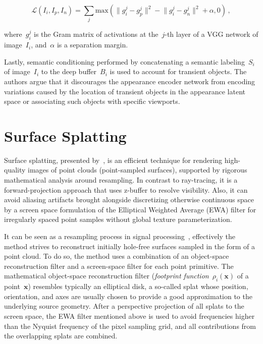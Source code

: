 $$\mathcal{L}(I_i, I_p, I_n) = \sum_j \mathrm{max}\left(\lVert g_i^j-g_p^j\rVert^2 - \lVert g_i^j-g_n^j\rVert^2 + \alpha, 0\right)\,,$$

where~$g_i^j$ is the Gram matrix of activations at the~$j$-th layer of a VGG network of image~$I_i$,
and~$\alpha$ is a separation margin.

Lastly, semantic conditioning performed by concatenating a semantic labeling~$S_i$ of
image~$I_i$ to the deep buffer~$B_i$ is used to account for transient objects. The authors argue that
it discourages the appearance encoder network from encoding variations caused by the location of
transient objects in the appearance latent space or associating such objects with specific viewports.

\section{Surface Splatting}

Surface splatting, presented by~\citet{SurfaceSplatting}, is an efficient technique for rendering high-quality
images of point clouds (point-sampled surfaces), supported by rigorous mathematical analysis around
resampling. In contrast to ray-tracing, it is a forward-projection approach that uses z-buffer to
resolve visibility. Also, it can avoid aliasing artifacts brought alongside discretizing otherwise
continuous space by a screen space formulation of the Elliptical Weighted Average (EWA) filter for
irregularly spaced point samples without global texture parameterization.

It can be seen as a resampling process in signal processing~\citep{PointRendering}, effectively the method
strives to reconstruct initially hole-free surfaces sampled in the form of a point cloud. To do so, the method
uses a combination of an object-space reconstruction filter and a screen-space filter for each point primitive.
The mathematical object-space reconstruction filter (\emph{footprint function}~$\rho_i(\mathbf{x})$ of a point~$\mathbf{x}$)
resembles typically an elliptical disk, a so-called splat whose position, orientation, and axes are usually
chosen to provide a good approximation to the underlying source geometry. After a perspective projection of all splats
to the screen space, the EWA filter mentioned above is used to avoid frequencies higher than the Nyquist frequency
of the pixel sampling grid, and all contributions from the overlapping splats are combined.

